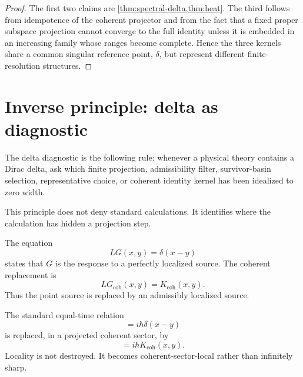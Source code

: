 \documentclass[11pt]{article}
\begin{document}
\begin{proof}
The first two claims are \cref{thm:spectral-delta,thm:heat}. The third follows from
idempotence of the coherent projector and from the fact that a fixed proper subspace
projection cannot converge to the full identity unless it is embedded in an increasing family
whose ranges become complete. Hence the three kernels share a common singular reference
point, \(\delta\), but represent different finite-resolution structures.
\end{proof}


\section{Inverse principle: delta as diagnostic}

\begin{definition}\label{def:delta-diagnostic}
The delta diagnostic is the following rule: whenever a physical theory contains a Dirac
delta, ask which finite projection, admissibility filter, survivor-basin selection,
representative choice, or coherent identity kernel has been idealized to zero width.
\end{definition}

This principle does not deny standard calculations.  It identifies where the calculation has
hidden a projection step.

\begin{example}
The equation
\begin{equation}
LG(x,y)=\delta(x-y)
\end{equation}
states that \(G\) is the response to a perfectly localized source.  The coherent replacement is
\begin{equation}
LG_{\mathrm{coh}}(x,y)=K_{\mathrm{coh}}(x,y).
\end{equation}
Thus the point source is replaced by an admissibly localized source.
\end{example}

\begin{example}
The standard equal-time relation
\begin{equation}
[\phi(t,x),\pi(t,y)]=i\hbar\delta(x-y)
\end{equation}
is replaced, in a projected coherent sector, by
\begin{equation}
[\phi_{\mathrm{coh}}(t,x),\pi_{\mathrm{coh}}(t,y)]
=i\hbar K_{\mathrm{coh}}(x,y).
\end{equation}
Locality is not destroyed.  It becomes coherent-sector-local rather than infinitely sharp.
\end{example}
\end{document}

